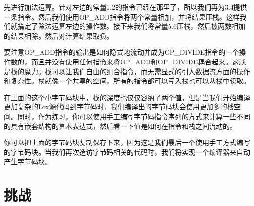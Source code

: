\documentclass[cn,11pt,chinese]{elegantbook}
\begin{document}
先进行加法运算。针对左边的常量1.2的指令已经在那里了，所以我们再为3.4提供一条指令。然后我们使用OP\_ADD指令将两个常量相加，并将结果压栈。这样我们就搞定了除法运算左边的操作数。接下来我们将常量5.6压栈，然后被两数相加的结果相除。然后对计算结果取负。

要注意OP\_ADD指令的输出是如何隐式地流动并成为OP\_DIVIDE指令的一个操作数的，而且并没有使用任何指令来将OP\_ADD和OP\_DIVIDE耦合起来。这就是栈的魔力。栈可以让我们自由的组合指令，而无需显式的引入数据流方面的操作和复杂性。栈就像一个共享的空间，所有的指令都可以写入栈也可以从栈中读取。

在上面的这个小字节码块中，栈的深度也仅仅容纳了两个值，但是当我们开始编译更加复杂的Lox源代码到字节码时，我们编译出的字节码块会使用更加多的栈空间。同时，作为练习，你可以使用手工编写字节码指令序列的方式来计算一些不同的具有嵌套结构的算术表达式，然后看一下值是如何在指令和栈之间流动的。

你可以把上面的字节码块复制保存下来，因为这是我们最后一个使用手工方式编写的字节码块。当我们再次造访字节码相关的代码时，我们将实现一个编译器来自动产生字节码块。

\section{挑战}
\end{document}
